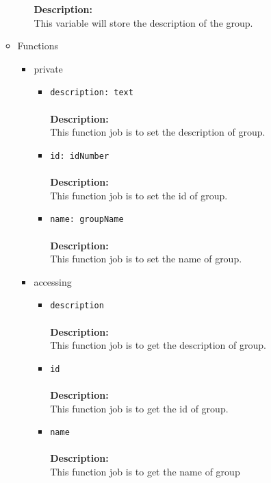 \begin{itemize}
\begin{itemize}
\begin{itemize}
     \textbf{Description:}\\
     This variable will store the description of the group.
\end{itemize}


\item Functions
\label{sec-1-4-2-11-2}%
\begin{itemize}

\item private
\label{sec-1-4-2-11-2-1}%
\begin{itemize}
\item \verb~description: text~\\\\
\textbf{Description:}\\
      This function job is to set the description of group.\\
\item \verb~id: idNumber~\\\\
\textbf{Description:}\\
      This function job is to set the id of group.\\
\item \verb~name: groupName~\\\\
\textbf{Description:}\\
      This function job is to set the name of group.\\
\end{itemize}


\item accessing
\label{sec-1-4-2-11-2-2}%
\begin{itemize}
\item \verb~description~\\\\
\textbf{Description:}\\
      This function job is to get the description of group.\\
\item \verb~id~\\\\
\textbf{Description:}\\
      This function job is to get the id of group.\\
\item \verb~name~\\\\
\textbf{Description:}\\
      This function job is to get the name of group\\
\end{itemize}


\end{itemize}
\end{itemize}
\end{itemize}
